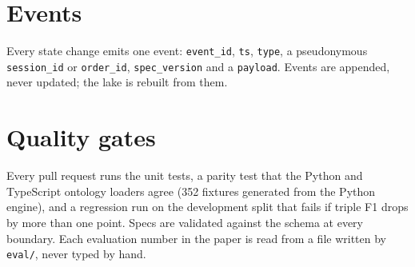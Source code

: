 \section{Events}

Every state change emits one event: \texttt{event\_id}, \texttt{ts}, \texttt{type}, a pseudonymous \texttt{session\_id} or \texttt{order\_id}, \texttt{spec\_version} and a \texttt{payload}. Events are appended, never updated; the lake is rebuilt from them.

\section{Quality gates}

Every pull request runs the unit tests, a parity test that the Python and TypeScript ontology loaders agree (352 fixtures generated from the Python engine), and a regression run on the development split that fails if triple F1 drops by more than one point. Specs are validated against the schema at every boundary. Each evaluation number in the paper is read from a file written by \texttt{eval/}, never typed by hand.
